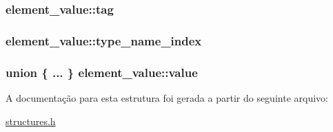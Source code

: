 \subsubsection[{\texorpdfstring{tag}{tag}}]{ element\+\_\+value\+::tag}\hypertarget{structelement__value_a2664460cf3cbd50f7116dcc6fc5dc049}{}\label{structelement__value_a2664460cf3cbd50f7116dcc6fc5dc049}
\subsubsection[{\texorpdfstring{type\+\_\+name\+\_\+index}{type_name_index}}]{ element\+\_\+value\+::type\+\_\+name\+\_\+index}\hypertarget{structelement__value_ad1925807cc4b5a79fa7fa56d46462ecb}{}\label{structelement__value_ad1925807cc4b5a79fa7fa56d46462ecb}
\subsubsection[{\texorpdfstring{value}{value}}]{\setlength{\rightskip}{0pt plus 5cm}union \{ ... \}   element\+\_\+value\+::value}\hypertarget{structelement__value_a4e0b4dd7c57280a3c485e3f5d03bee80}{}\label{structelement__value_a4e0b4dd7c57280a3c485e3f5d03bee80}


A documentação para esta estrutura foi gerada a partir do seguinte arquivo\+:\begin{DoxyCompactItemize}
\item 
\hyperlink{structures_8h}{structures.\+h}\end{DoxyCompactItemize}
